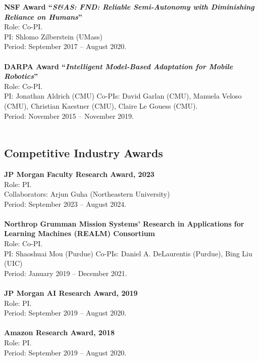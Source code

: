 \documentclass[Times]{article}
\newcommand{\funding}[1]{#1\\}
\renewcommand{\funding}[1]{\\}
\begin{document}
\textbf{NSF Award ``\emph{S\&AS: FND: Reliable Semi-Autonomy with Diminishing Reliance
on Humans}''}\\
Role: Co-PI.\\
PI: Shlomo Zilberstein (UMass)\\
Period: September 2017 -- August 2020.\\
\funding{Total funding: \$699,512.}

\textbf{DARPA Award ``\emph{Intelligent Model-Based Adaptation for Mobile
  Robotics}''}\\
Role: Co-PI.\\
PI: Jonathan Aldrich (CMU)
Co-PIs: David Garlan (CMU), Manuela Veloso
(CMU), Christian Kaestner (CMU), Claire Le Gouess (CMU).\\
Period: November 2015 -- November 2019.\\
\funding{PI Biswas' share: \$377,019.}

\vspace{-1.5em}
\subsection*{Competitive Industry Awards}

\textbf{JP Morgan Faculty Research Award, 2023}\\
Role: PI.\\
Collaborators: Arjun Guha (Northeastern University)\\
Period: September 2023 -- August 2024.\\
\funding{Amount: \$60,000.}

\textbf{Northrop Grumman Mission Systems’ Research in Applications for Learning Machines (REALM) Consortium}\\
Role: Co-PI.\\
PI: Shaoshuai Mou (Purdue)
Co-PIs: Daniel A. DeLaurentis (Purdue), Bing Liu (UIC)\\
Period: January 2019 -- December 2021.\\
\funding{Total funding: \$1,200,000. PI Biswas' share: \$302,668}

\textbf{JP Morgan AI Research Award, 2019}\\
Role: PI.\\
Period: September 2019 -- August 2020.\\
\funding{Amount: \$147,424.}

\textbf{Amazon Research Award, 2018}\\
Role: PI.\\
Period: September 2019 -- August 2020.\\
\funding{Amount: \$80,000.}
\end{document}
